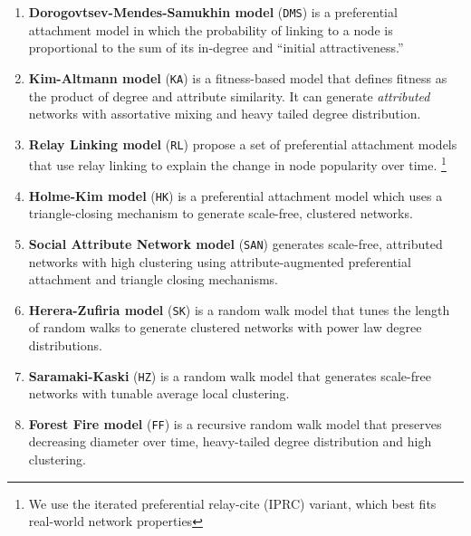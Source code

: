 \begin{enumerate}
	\item{\textbf{Dorogovtsev-Mendes-Samukhin model}} \cite{dorogovtsev2000structure}  (\texttt{DMS})
	is a preferential attachment model in which the probability of linking to a node is proportional
	to the sum of its in-degree and ``initial attractiveness.''

	\item{\textbf{Kim-Altmann model}} \cite{kim2017effect} (\texttt{KA}) is a fitness-based model that defines
	fitness as the product of degree and attribute similarity. It can generate \textit{attributed} networks with assortative mixing and
	heavy tailed degree distribution.

	\item{\textbf{Relay Linking model}} \cite{singh2017relay} (\texttt{RL}) propose a set of
	preferential attachment models that use relay linking to explain the change in node popularity over time.
	\footnote{We use the iterated preferential relay-cite (IPRC) variant, which best fits real-world network properties}

	\item{\textbf{Holme-Kim model}} \cite{holme2002growing} (\texttt{HK}) is a preferential attachment model
	which uses a triangle-closing mechanism to generate scale-free, clustered networks.

	\item{\textbf{Social Attribute Network model}} \cite{gong2012evolution} (\texttt{SAN}) generates
	scale-free, attributed networks with high clustering using attribute-augmented
	preferential attachment and triangle closing mechanisms.


	\item{\textbf{Herera-Zufiria model}} \cite{saramaki2004scale} (\texttt{SK})  is a random walk model
	that tunes the length of random walks to generate clustered networks with power law degree distributions.

	\item{\textbf{Saramaki-Kaski}} \cite{herrera2011generating} (\texttt{HZ}) is a random walk model
	that generates scale-free networks with tunable average local clustering.

	\item{\textbf{Forest Fire model}} \cite{leskovec2005graphs} (\texttt{FF}) is a recursive random walk model
	that preserves decreasing diameter over time, heavy-tailed degree distribution
	and high clustering.
\end{enumerate}

